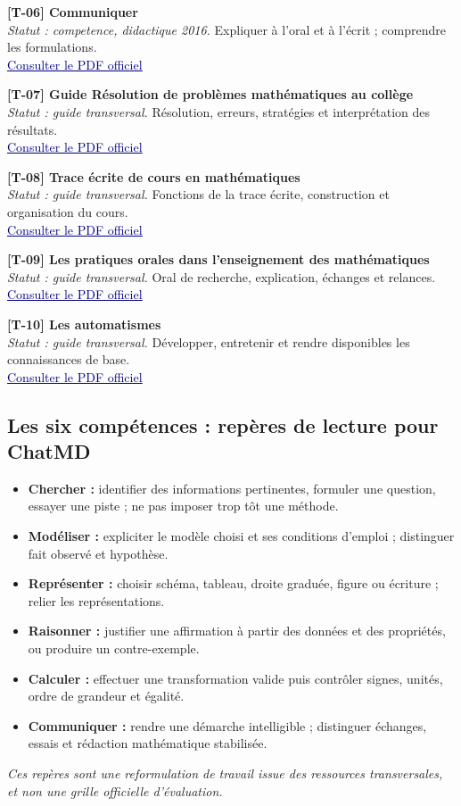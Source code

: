 \documentclass[11pt,a4paper]{article}
\newcommand{\refsource}[1]{\textsf{\textcolor{slate}{[#1]}}}
\newcommand{\entreesource}[5]{\par\noindent\textbf{\refsource{#1} #2}\\[-2pt]\textit{Statut : #3.} #4\\[-2pt]\href{#5}{\textcolor{navy}{\underline{Consulter le PDF officiel}}}\par\smallskip}
\begin{document}
\entreesource{T-06}{Communiquer}{competence, didactique 2016}{Expliquer à l’oral et à l’écrit ; comprendre les formulations.}{https://eduscol.education.gouv.fr/sites/default/files/document/ra16c4mathcommecritoralpourmontage548548pdf-77598.pdf}

\entreesource{T-07}{Guide Résolution de problèmes mathématiques au collège}{guide transversal}{Résolution, erreurs, stratégies et interprétation des résultats.}{https://eduscol.education.gouv.fr/sites/default/files/document/guide-resolution-de-problemes-mathematiques-au-college-73914.pdf}

\entreesource{T-08}{Trace écrite de cours en mathématiques}{guide transversal}{Fonctions de la trace écrite, construction et organisation du cours.}{https://eduscol.education.gouv.fr/sites/default/files/document/trace-ecrite-de-cours-en-mathspdf-91731.pdf}

\entreesource{T-09}{Les pratiques orales dans l’enseignement des mathématiques}{guide transversal}{Oral de recherche, explication, échanges et relances.}{https://eduscol.education.gouv.fr/sites/default/files/document/les-pratiques-orales-dans-lenseignement-des-mathspdf-91728.pdf}

\entreesource{T-10}{Les automatismes}{guide transversal}{Développer, entretenir et rendre disponibles les connaissances de base.}{https://eduscol.education.gouv.fr/sites/default/files/document/automatismes-mathematiquespdf-91875.pdf}
\subsection{Les six compétences : repères de lecture pour ChatMD}
\begin{itemize}
\item \textbf{Chercher :} identifier des informations pertinentes, formuler une question, essayer une piste ; ne pas imposer trop tôt une méthode.
\item \textbf{Modéliser :} expliciter le modèle choisi et ses conditions d'emploi ; distinguer fait observé et hypothèse.
\item \textbf{Représenter :} choisir schéma, tableau, droite graduée, figure ou écriture ; relier les représentations.
\item \textbf{Raisonner :} justifier une affirmation à partir des données et des propriétés, ou produire un contre-exemple.
\item \textbf{Calculer :} effectuer une transformation valide puis contrôler signes, unités, ordre de grandeur et égalité.
\item \textbf{Communiquer :} rendre une démarche intelligible ; distinguer échanges, essais et rédaction mathématique stabilisée.
\end{itemize}
\textit{Ces repères sont une reformulation de travail issue des ressources transversales, et non une grille officielle d'évaluation.}
\end{document}
